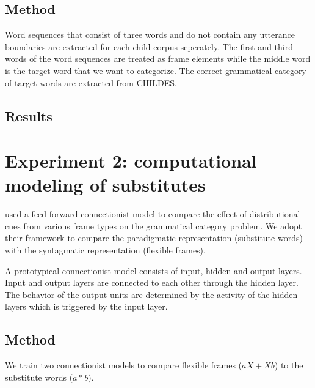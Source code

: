\subsection{Method}
Word sequences that consist of three words and do not contain any
utterance boundaries are extracted for each child corpus seperately.
The first and third words of the word sequences are treated as frame
elements while the middle word is the target word that we want to
categorize.  The correct grammatical category of target words are
extracted from CHILDES.


\subsection{Results}

\section{Experiment 2: computational modeling of substitutes}

\cite{clair2010} used a feed-forward connectionist model to compare
the effect of distributional cues from various frame types on the
grammatical category problem.  We adopt their framework to compare the
paradigmatic representation (substitute words) with the syntagmatic
representation (flexible frames).

A prototypical connectionist model consists of input, hidden and
output layers.  Input and output layers are connected to each other
through the hidden layer.  The behavior of the output units are
determined by the activity of the hidden layers which is triggered by
the input layer.

\subsection{Method}

We train two connectionist models to compare flexible frames ($aX+Xb$)
to the substitute words ($a*b$).

